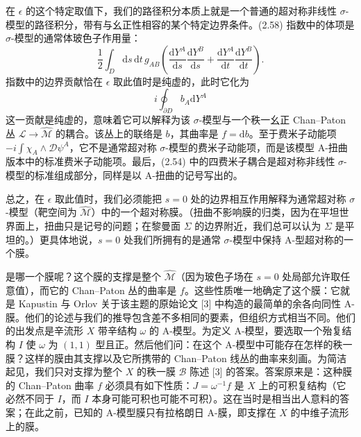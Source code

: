 \documentclass[11pt,a4paper,UTF8]{ctexart}
\theoremstyle{plain}
\theoremstyle{definition}
\begin{document}
在 $\epsilon$ 的这个特定取值下，我们的路径积分本质上就是一个普通的超对称非线性 $\sigma$-模型的路径积分，带有与幺正性相容的某个特定边界条件。(2.58) 指数中的体项是 $\sigma$-模型的通常体玻色子作用量：
\begin{equation}
    \frac{1}{2}\int_D \mathrm{d}s\,\mathrm{d}t\,g_{AB}\left(\frac{\mathrm{d}Y^A}{\mathrm{d}s}\frac{\mathrm{d}Y^B}{\mathrm{d}s}+\frac{\mathrm{d}Y^A}{\mathrm{d}t}\frac{\mathrm{d}Y^B}{\mathrm{d}t}\right).
    \tag{2.59}
\end{equation}
指数中的边界贡献恰在 $\epsilon$ 取此值时是纯虚的，此时它化为
\begin{equation}
    i\oint_{\partial D} b_A\mathrm{d}Y^A
    \tag{2.60}
\end{equation}
这一贡献是纯虚的，意味着它可以解释为该 $\sigma$-模型与一个秩一幺正 Chan--Paton 丛 $\mathcal{L}\to\widehat{\mathcal{M}}$ 的耦合。该丛上的联络是 $b$，其曲率是 $f=\mathrm{d}b$。至于费米子动能项 $-i\int\chi_A\wedge\mathcal{D}\psi^A$，它不是通常超对称 $\sigma$-模型的费米子动能项，而是该模型 A-扭曲版本中的标准费米子动能项。最后，(2.54) 中的四费米子耦合是超对称非线性 $\sigma$-模型的标准组成部分，同样是以 A-扭曲的记号写出的。

总之，在 $\epsilon$ 取此值时，我们必须能把 $s=0$ 处的边界相互作用解释为通常超对称 $\sigma$-模型（靶空间为 $\widehat{\mathcal{M}}$）中的一个超对称膜。（扭曲不影响膜的归类，因为在平坦世界面上，扭曲只是记号的问题；在黎曼面 $\Sigma$ 的边界附近，我们总可以认为 $\Sigma$ 是平坦的。）更具体地说，$s=0$ 处我们所拥有的是通常 $\sigma$-模型中保持 A-型超对称的一个膜。

是哪一个膜呢？这个膜的支撑是整个 $\widehat{\mathcal{M}}$（因为玻色子场在 $s=0$ 处局部允许取任意值），而它的 Chan--Paton 丛的曲率是 $f$。这些性质唯一地确定了这个膜：它就是 Kapustin 与 Orlov 关于该主题的原始论文 [3] 中构造的最简单的余各向同性 A-膜。他们的论述与我们的推导包含差不多相同的要素，但组织方式相当不同。他们的出发点是辛流形 $X$ 带辛结构 $\omega$ 的 A-模型。为定义 A-模型，要选取一个殆复结构 $I$ 使 $\omega$ 为 $(1,1)$ 型且正。然后他们问：在这个 A-模型中可能存在怎样的秩一膜？这样的膜由其支撑以及它所携带的 Chan--Paton 线丛的曲率来刻画。为简洁起见，我们只对支撑为整个 $X$ 的秩一膜 $\mathcal{B}$ 陈述 [3] 的答案。答案原来是：这种膜的 Chan--Paton 曲率 $f$ 必须具有如下性质：$J=\omega^{-1}f$ 是 $X$ 上的可积复结构（它必然不同于 $I$，而 $I$ 本身可能可积也可能不可积）。这在当时是相当出人意料的答案；在此之前，已知的 A-模型膜只有拉格朗日 A-膜，即支撑在 $X$ 的中维子流形上的膜。

\end{document}
